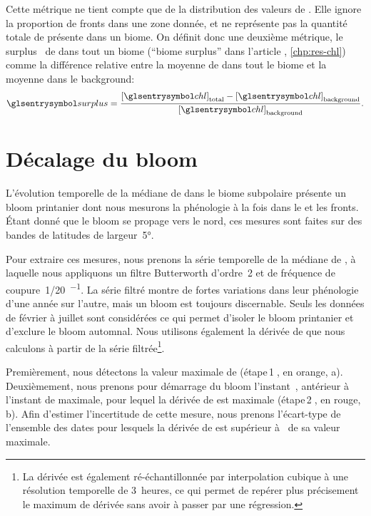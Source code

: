 Cette métrique ne tient compte que de la distribution des valeurs de . Elle ignore la proportion de fronts dans une zone donnée, et ne représente pas la quantité totale de  présente dans un biome.
On définit donc une deuxième métrique, le surplus~ de  dans tout un biome (\enquote{biome surplus} dans l'article , \cref*{chp:res-chl}) comme la différence relative entre la moyenne de  dans tout le biome et la moyenne dans le background:
\begin{equation}
  \am{surplus} = \frac{\moy{\am{chl}}_\tot - \moy{\am{chl}}_\bkg}
  {\moy{\am{chl}}_\bkg} .
\end{equation}

\section{Décalage du bloom}
\label{sec:decalage-bloom}

L'évolution temporelle de la médiane de  dans le biome subpolaire présente un bloom printanier dont nous mesurons la phénologie  à la fois dans le  et les fronts.
Étant donné que le bloom se propage vers le nord, ces mesures sont faites sur des bandes de latitudes de largeur~\ang[mode=math]{5}.

Pour extraire ces mesures, nous prenons la série temporelle de la médiane de , à laquelle nous appliquons un filtre Butterworth d'ordre~2 et de fréquence de coupure~\qty[parse-numbers=false]{1/20}{\jours^{-1}}.
La série filtré montre de fortes variations dans leur phénologie d'une année sur l'autre, mais un bloom est toujours discernable.
Seuls les données de février à juillet sont considérées ce qui permet d'isoler le bloom printanier et d'exclure le bloom automnal.
Nous utilisons également la dérivée de  que nous calculons à partir de la série filtrée\footnote{%
  La dérivée est également ré-échantillonnée par interpolation cubique à une résolution temporelle de 3~heures, ce qui permet de repérer plus précisement le maximum de dérivée sans avoir à passer par une régression.
}.

Premièrement, nous détectons la valeur maximale de  (étape\,\textcircled{1}, en orange, a).
Deuxièmement, nous prenons pour démarrage du bloom l'instant~, antérieur à l'instant de  maximale, pour lequel la dérivée de  est maximale (étape\,\textcircled{2}, en rouge, b).
Afin d'estimer l'incertitude de cette mesure, nous prenons l'écart-type de l'ensemble des dates pour lesquels la dérivée de  est supérieur à~ de sa valeur maximale.

